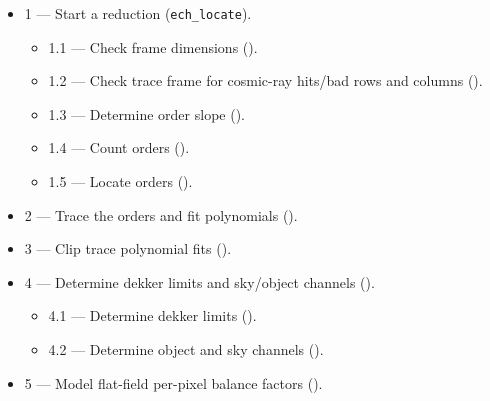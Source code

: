 \begin{itemize}

\item 1 --- Start a reduction (\verb+ech_locate+).

\begin{itemize}

   \item 1.1 --- Check frame dimensions
         ().

   \item {1.2 --- Check trace frame for cosmic-ray hits/bad rows and columns
         ().}

   \item {1.3 --- Determine order slope
         ().}

   \item {1.4 --- Count orders
         ().}

   \item {1.5 --- Locate orders
         ().}

\end{itemize}

\item {2 --- Trace the orders and fit polynomials
      ().}

\item {3 --- Clip trace polynomial fits
      ().}

\item {4 --- Determine dekker limits and sky/object channels
      ().}

\begin{itemize}
\item {4.1 --- Determine dekker limits
      ().}

\item {4.2 --- Determine object and sky channels
      ().}

\end{itemize}

\item {5 --- Model flat-field per-pixel balance factors
      ().}


\end{itemize}
